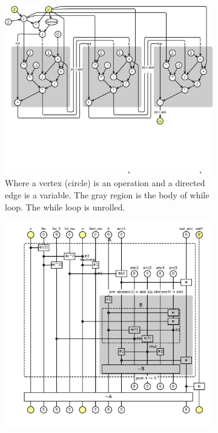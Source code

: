 \documentclass[aps,twocolumn,longbibliography,english,superscriptaddress]{revtex4-1}
\newcommand{\<}{\langle}
\renewcommand{\>}{\rangle}
\theoremstyle{definition}\newtheorem{definition}{\textit{Definition}}
\begin{document}
\begin{figure}[t!]
    \centering
    \begin{subfigure}[t]{0.53\textwidth}
        \centering
        \includegraphics[width=\columnwidth,trim={0 4cm 0 0cm},clip]{images/computational_graph.pdf}
        \caption{Where a vertex (circle) is an operation and a directed edge is a variable. The gray region is the body of while loop. The while loop is unrolled.}\label{fig:computational-graph}
    \end{subfigure}%
    \begin{subfigure}[t]{0.47\textwidth}
        \centering
        \includegraphics[width=\columnwidth,trim={0 1cm 0 0cm},clip]{images/fig4.pdf}

\end{subfigure}
\end{figure}
\end{document}
